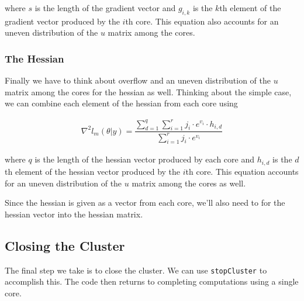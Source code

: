 \documentclass{article}
\begin{document}
\noindent where $s$ is the length of the gradient vector and $g_{i,k}$ is the $k$th element of the gradient vector produced by the $i$th core. This equation also accounts for an uneven distribution of the $u$ matrix among the cores.

\subsubsection{The Hessian}
Finally we have to think about overflow and an uneven distribution of the $u$ matrix among the cores for the hessian as well. Thinking about the simple case, we can combine each element of the hessian from each core using

\begin{align}
\nabla^2 l_m(\theta|y) = \dfrac{\sum\limits_{d=1}^q \sum\limits_{i=1}^r j_i \cdot e^{v_i} \cdot h_{i,d}}{\sum\limits_{i=1}^r j_i \cdot e^{v_i}}
\end{align}

\noindent where $q$ is the length of the hessian vector produced by each core and $h_{i, d}$ is the $d$th element of the hessian vector produced by the $i$th core. This equation accounts for an uneven distribution of the $u$ matrix among the cores as well. 

Since the hessian is given as a vector from each core, we'll also need to for the hessian vector into the hessian matrix. 

\subsection{Closing the Cluster}
The final step we take is to close the cluster. We can use \texttt{stopCluster} to accomplish this. The code then returns to completing computations using a single core. 
\end{document}
